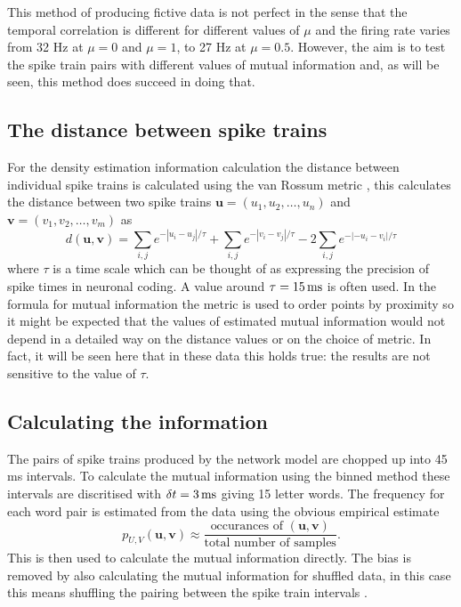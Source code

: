 \documentclass[12pt]{article}
\newcommand{\ms}{\mbox{\,ms}}
\renewcommand{\u}{\mathbf{u}}
\renewcommand{\v}{\mathbf{v}}
\begin{document}
This method of producing fictive data is not perfect in the sense that
the temporal correlation is different for different values of $\mu$
and the firing rate varies from 32 Hz at $\mu=0$ and $\mu=1$, to 27 Hz
at $\mu=0.5$. However, the aim is to test the spike train pairs with
different values of mutual information and, as will be seen, this
method does succeed in doing that.

\subsection{The distance between spike trains}

For the density estimation information calculation the distance between individual
spike trains is calculated using the van Rossum metric
\citep{vanRossum2001}, this calculates the distance between two spike
trains $\u=(u_1,u_2,\ldots,u_n)$ and
$\v=(v_1,v_2,\ldots,v_m)$ as
\begin{equation}
d(\u,\v)=\sum_{i,j} e^{-|u_i-u_j|/\tau}+\sum_{i,j} e^{-|v_i-v_j|/\tau}-2\sum_{i,j} e^{-|-u_i-v_i|/\tau}
\end{equation}
where $\tau$ is a time scale which can be thought of as expressing the
precision of spike times in neuronal coding. A value around
$\tau=15\ms$ is often used. In the formula for mutual information the
metric is used to order points by proximity so it might be expected
that the values of estimated mutual information would not depend in a
detailed way on the distance values or on the choice of metric. In
fact, it will be seen here that in these data this holds true: the
results are not sensitive to the value of $\tau$.

\subsection{Calculating the information}

The pairs of spike trains produced by the network model are chopped up
into 45 ms intervals. To calculate the mutual information using the
binned method these intervals are discritised with $\delta
t=3\ms$ giving 15 letter words. The frequency for each word pair is
estimated from the data using the obvious empirical estimate
\begin{equation}
p_{U,V}(\u,\v)\approx \frac{\mbox{occurances of }(\u,\v)}{\mbox{total number of samples}}.
\end{equation}
This is then used to calculate the mutual information directly. The
bias is removed by also calculating the mutual information for
shuffled data, in this case this means shuffling the pairing between
the spike train intervals \citep{NirenbergEtAl2001,MontemurroEtAl2007,
  PanzeriEtAl2007,MagriEtAl2009}.
\end{document}
